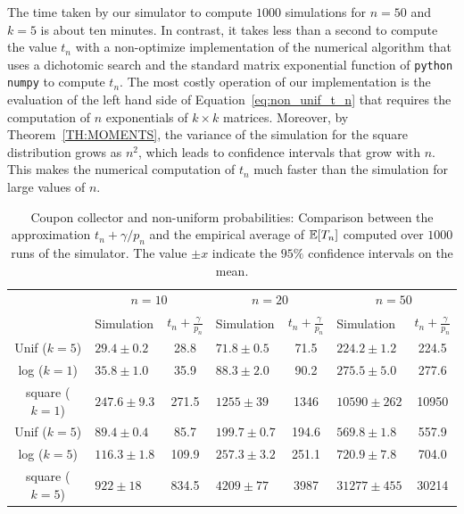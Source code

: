 \documentclass{aptpub}
\newcommand\expect[1]{\mathchoice{\bexpect{#1}}{\sexpect{#1}}{\sexpect{#1}}{\sexpect{#1}}}
\newcommand\bexpect[1]{\mathbb{E}\left[#1\right]}
\newcommand\sexpect[1]{\mathbb{E}[#1]}
\begin{document}
The time taken by our simulator to compute $1000$ simulations for
$n=50$ and $k=5$ is about ten minutes. In contrast, it takes less than
a second to compute the value $t_n$ with a non-optimize implementation
of the numerical algorithm that uses a dichotomic search and the
standard matrix exponential function of \texttt{python} \texttt{numpy}
to compute $t_n$. The most costly operation of our implementation is
the evaluation of the left hand side of
Equation~\eqref{eq:non_unif_t_n} that requires the computation of $n$
exponentials of $k\times k$ matrices. Moreover, by
Theorem~\ref{TH:MOMENTS}, the variance of the simulation for the
square distribution grows as $n^2$, which leads to confidence
intervals that grow with $n$. This makes the numerical computation of
$t_n$ much faster than the simulation for large values of $n$.

\begin{table}[ht]
  \centering
  \begin{tabular}{|c|l:c|l:c|l:c|}
    \hline
    &&
     &
     \\
    &Simulation & $t_n{+}\frac{\gamma}{p_n}$ &Simulation & $t_n{+}\frac{\gamma}{p_n}$ &Simulation & $t_n{+}\frac{\gamma}{p_n}$  \\
    \hline
    \hline
    Unif ($k=5$)& $29.4\pm0.2$&28.8&$71.8\pm0.5$&71.5&$224.2\pm1.2$&224.5\\
    \hline log
    ($k=1$)&$35.8\pm1.0$&35.9&$88.3\pm2.0$&90.2&$275.5\pm5.0$&277.6\\
    \hline square ($k=1$)&$247.6\pm9.3$&271.5&$1255\pm39$&1346&$10590\pm262$&10950\\
    \hline Unif ($k=5$)&$89.4\pm0.4$&85.7&$199.7\pm0.7$&194.6&$569.8\pm1.8$&557.9
    \\\hline log ($k=5$)&
                        $116.3\pm1.8$&109.9&$257.3\pm3.2$&251.1&$720.9\pm7.8$&704.0
    \\\hline square
    ($k=5$)&$922\pm18$&834.5&$4209\pm77$&3987&$31277\pm455$ & 30214\\
    \hline
  \end{tabular}
  \caption{Coupon collector and non-uniform probabilities: Comparison
    between the approximation $t_n+\gamma/p_n$ and the empirical average
    of $\expect{T_n}$ computed over $1000$ runs of the simulator.  The
    value $\pm x$ indicate the $95\%$ confidence intervals on the
    mean. } 
  \label{tab:non_unif}
\end{table}
\end{document}
